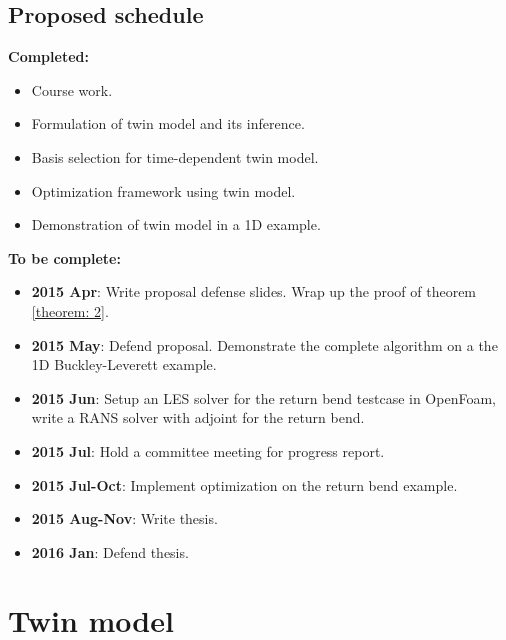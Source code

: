 \documentclass[a4paper,onecolumn]{article}
\theoremstyle{remark}
\begin{document}
\subsection{Proposed schedule}
\noindent \textbf{Completed:}
\begin{itemize}
    \item Course work.
    \item Formulation of twin model and its inference.
    \item Basis selection for time-dependent twin model.
    \item Optimization framework using twin model.
    \item Demonstration of twin model in a 1D example.
\end{itemize}
\noindent \textbf{To be complete:}
\begin{itemize}
    \item \textbf{2015 Apr}: Write proposal defense slides. Wrap up the proof of theorem \ref{theorem: 2}.
    \item \textbf{2015 May}: Defend proposal. Demonstrate the complete algorithm on a the 1D Buckley-Leverett example.
    \item \textbf{2015 Jun}: Setup an LES solver for the return bend testcase in OpenFoam, write a RANS solver with adjoint for the return bend.
    \item \textbf{2015 Jul}: Hold a committee meeting for progress report.
    \item \textbf{2015 Jul-Oct}: Implement optimization on the return bend example.
    \item \textbf{2015 Aug-Nov}: Write thesis.
    \item \textbf{2016 Jan}: Defend thesis.
\end{itemize}

\newpage
\section{Twin model}
\label{gradient_surrogate}
\end{document}
